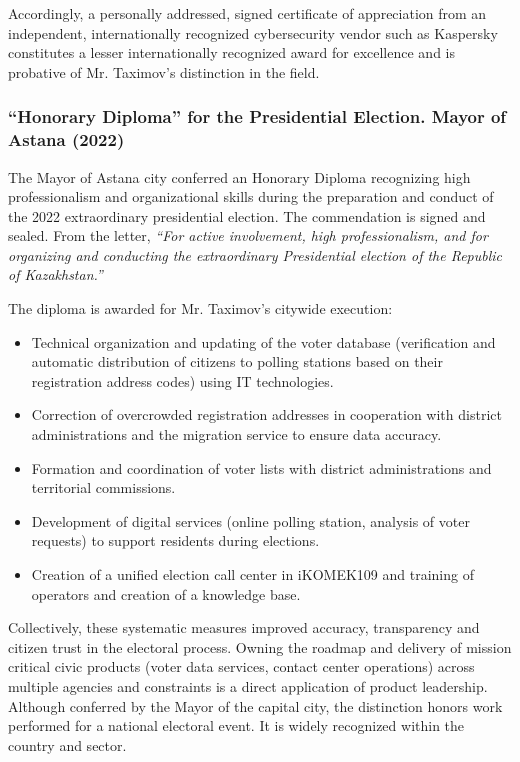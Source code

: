 
Accordingly, a personally addressed, signed certificate of appreciation from an independent, internationally recognized cybersecurity vendor such as Kaspersky constitutes a lesser internationally recognized award for excellence and is probative of Mr. Taximov's distinction in the field.

\subsubsection{``Honorary Diploma'' for the Presidential Election. Mayor of Astana (2022)}

The Mayor of Astana city conferred an Honorary Diploma recognizing high professionalism and organizational skills during the preparation and conduct of the 2022 extraordinary presidential election. The commendation is signed and sealed. From the letter, \emph{``For active involvement, high professionalism, and for organizing and conducting the extraordinary Presidential election of the Republic of Kazakhstan.''} 

The diploma is awarded for Mr. Taximov's citywide execution:

\vspace{-0.5\baselineskip}
\begin{itemize}[nosep]
\item Technical organization and updating of the voter database (verification and automatic distribution of citizens to polling stations based on their registration address codes) using IT technologies.
\item Correction of overcrowded registration addresses in cooperation with district administrations and the migration service to ensure data accuracy.
\item Formation and coordination of voter lists with district administrations and territorial commissions.
\item Development of digital services (online polling station, analysis of voter requests) to support residents during elections.
\item Creation of a unified election call center in iKOMEK109 and training of operators and creation of a knowledge base.
\end{itemize}

Collectively, these systematic measures improved accuracy, transparency and citizen trust in the electoral process. Owning the roadmap and delivery of mission critical civic products (voter data services, contact center operations) across multiple agencies and constraints is a direct application of product leadership. Although conferred by the Mayor of the capital city, the distinction honors work performed for a national electoral event. It is widely recognized within the country and sector.
